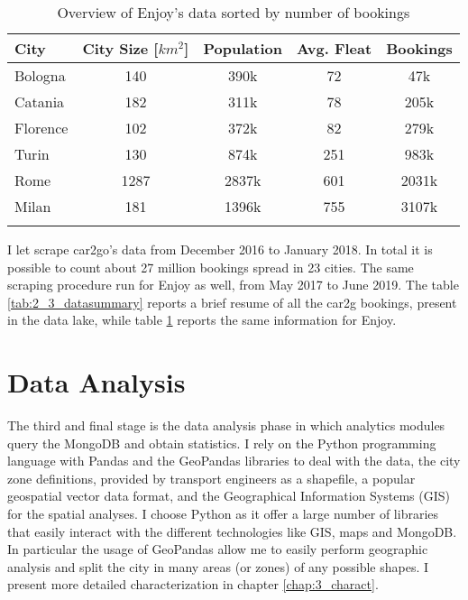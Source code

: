 \begin{table}
	\setlength{\tabcolsep}{2.3pt}
	\centering
	\caption{Overview of Enjoy's data sorted by number of bookings}
	\begin{tabular}{lcccc}
		\hline
		City &  City Size [$km^2$]\footnotemark[\value{footnote}] & Population \footnotemark[\value{footnote}] &  Avg. Fleat & Bookings\\ 
		\hline
		\hline
		Bologna			         &140    & 390k & 72 & 47k \\
		Catania			          &182    & 311k & 78 & 205k \\	
		Florence 	  			 & 102  & 372k & 82 & 279k \\
		Turin 					   & 130   & 874k & 251 & 983k \\
		Rome 					  & 1287 & 2837k & 601 & 2031k \\
		Milan 					   & 181   & 1396k & 755 & 3107k \\



		\hline
		\label{tab:2_3_datasummary_enjoy}
	\end{tabular}
\end{table}


I let \tool scrape car2go's data from December 2016 to January 2018. In total it is possible to count about 27 million bookings spread in 23 cities. The same scraping procedure run for Enjoy as well, from May 2017 to June 2019.  The table \ref{tab:2_3_datasummary} reports a brief resume of all the car2g bookings, present in the data lake, while table \ref{tab:2_3_datasummary_enjoy} reports the same information for Enjoy.




\section{Data Analysis}
\label{sec:2_5_data_analysyes}
The third and final stage is the data analysis phase in which analytics modules query the MongoDB and obtain statistics. I rely on the Python programming language with Pandas and the GeoPandas libraries to deal with the data, the city zone definitions, provided by transport engineers as a shapefile, a popular geospatial vector data format, and the Geographical Information Systems (GIS) for the spatial analyses. I choose Python as it offer a large number of  libraries that easily interact with the different technologies like GIS, maps and MongoDB. In particular the usage of GeoPandas allow me to easily perform geographic analysis and split the city in many areas (or zones) of any possible shapes. I present more detailed characterization in chapter \ref{chap:3_charact}.


